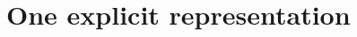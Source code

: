 \documentclass[11pt]{article}
\begin{document}

\section{One explicit representation}\label{sec:explicit}


 





\end{document}
